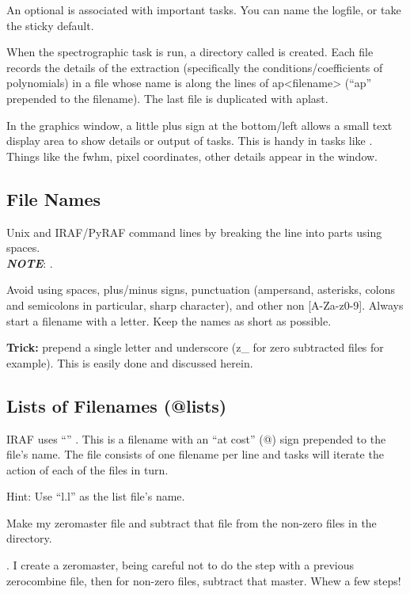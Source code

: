 An optional  is associated with important tasks. You can name the logfile,
or take the sticky default.

When the spectrographic task  is run, a directory called
 is created. Each file records the details of the extraction
(specifically the conditions/coefficients of polynomials) in a file
whose name is along the lines of ap<filename> (``ap'' prepended to the
filename). The last file is duplicated with aplast.

In the graphics window, a little plus sign at the bottom/left allows
a small text display area to show details or output of tasks. This is handy in tasks
like . Things like the fwhm, pixel coordinates, other details appear in
the window.


\subsection{File Names}

Unix and IRAF/PyRAF  command lines by breaking the line into parts
using spaces.\\
 \textbf{\emph{NOTE}}: .

Avoid using spaces, plus/minus signs, punctuation (ampersand,
asterisks, colons and semicolons in particular, sharp character), and
other non [A-Za-z0-9]. Always start a filename with a letter. Keep the
names as short as possible.

\textbf{Trick:} prepend a single letter and underscore (z\_ for zero subtracted files for
example). This is easily done and discussed herein.

\subsection{Lists of Filenames (@lists)}

IRAF uses ``'' . This is a filename with an ``at cost'' (@) sign prepended to
the file's name. The file consists of one filename per line and tasks will iterate the
action of each of the files in turn.

Hint: Use ``l.l'' as the list file's name. 

\example Make my zeromaster file and subtract that file from the non-zero files in the directory.


\exercise. I create a zeromaster, being careful not to do the step with a previous zerocombine
file, then for non-zero files, subtract that master. Whew a few steps!

